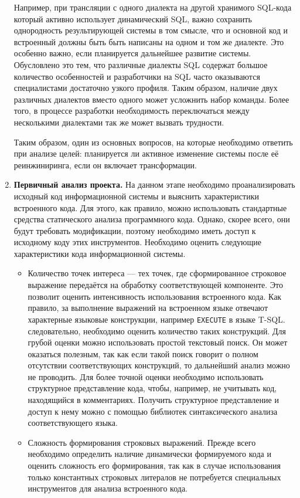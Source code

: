 \begin{enumerate}
  Например, при трансляции с одного диалекта на другой хранимого SQL-кода который активно использует динамический SQL, важно сохранить однородность результирующей системы в том смысле, что и основной код и встроенный должны быть быть написаны на одном и том же диалекте. Это особенно важно, если планируется дальнейшее развитие системы. Обусловлено это тем, что различные диалекты SQL содержат большое количество особенностей и разработчики на SQL часто оказываются специалистами достаточно узкого профиля. Таким образом, наличие двух различных диалектов вместо одного может усложнить набор команды. Более того, в процессе разработки необходимость переключаться между несколькими диалектами так же может вызвать трудности.
  
  Таким образом, один из основных вопросов, на которые необходимо ответить при анализе целей: планируется ли активное изменение системы после её реинжиниринга, если он включает трансформации.
  
  \item \textbf{Первичный анализ проекта.} На данном этапе необходимо проанализировать исходный код информационной системы и выяснить характеристики встроенного кода. Для этого, как правило, можно использовать стандартные средства статического анализа программного кода. Однако, скорее всего, они будут требовать модификации, поэтому необходимо иметь доступ к исходному коду этих инструментов. Необходимо оценить следующие характеристики кода информационной системы.
  \begin{itemize}
    \item Количество точек интереса --- тех точек, где сформированное строковое выражение передаётся на обработку соответствующей компоненте. Это позволит оценить интенсивность использования встроенного кода. Как правило, за выполнение выражений на встроенном языке отвечают характерные языковые конструкции, например \verb|EXECUTE| в языке T-SQL. следовательно, необходимо оценить количество таких конструкций. Для грубой оценки можно использовать простой текстовый поиск. Он может оказаться полезным, так как если такой поиск говорит о полном отсутствии соответствующих конструкций, то дальнейший анализ можно не проводить. Для более точной оценки необходимо использовать структурное представление кода, чтобы, например, не учитывать код, находящийся в комментариях. Получить структурное представление и доступ к нему можно с помощью библиотек синтаксического анализа соответствующего языка.
    
    \item Сложность формирования строковых выражений. Прежде всего необходимо определить наличие динамически формируемого кода и оценить сложность его формирования, так как в случае использования только константных строковых литералов не потребуется специальных инструментов для анализа встроенного кода.
    

\end{itemize}
\end{enumerate}

